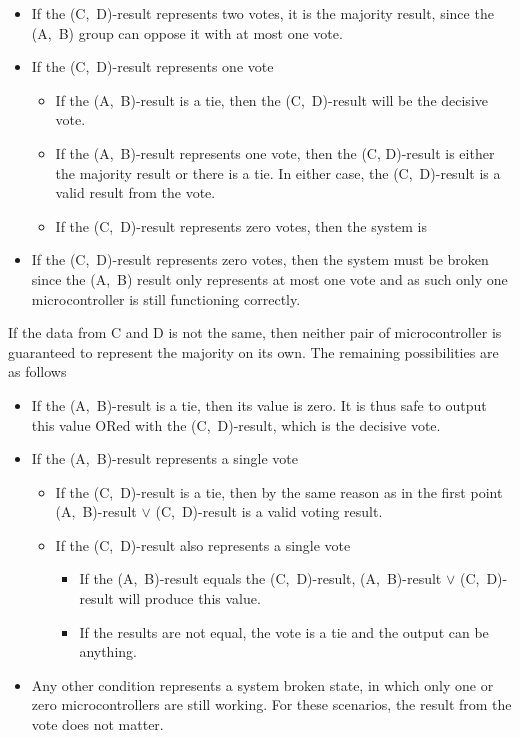 \begin{itemize}
\item If the (C,~D)-result represents two votes, it is the majority
  result, since the (A,~B) group can oppose it with at most one vote. 
  
\item If the (C,~D)-result represents one vote
  \begin{itemize}
  \item If the (A,~B)-result is a tie, then the (C,~D)-result will be
    the decisive vote. 
  \item If the (A,~B)-result represents one vote, then the (C,
    D)-result is either the majority result or there is a tie. In
    either case, the (C,~D)-result is a valid result from the vote.
  \item If the (C,~D)-result represents zero votes, then the system is
  \end{itemize}

\item If the (C,~D)-result represents zero votes, then the system must
  be broken since the (A,~B) result only represents at most one vote
  and as such only one microcontroller is still functioning correctly.
\end{itemize}

If the data from C and D is not the same, then neither pair of
microcontroller is guaranteed to represent the majority on its
own. The remaining possibilities are as follows

\begin{itemize}
\item If the (A,~B)-result is a tie, then its value is zero. It is
  thus safe to output this value ORed with the (C,~D)-result, which is
  the decisive vote.

\item If the (A,~B)-result represents a single vote
  \begin{itemize}
  \item If the (C,~D)-result is a tie, then by the same reason as in
    the first point (A,~B)-result $\vee$ (C,~D)-result is a valid
    voting result.

  \item If the (C,~D)-result also represents a single vote
    \begin{itemize}
    \item If the (A,~B)-result equals the (C,~D)-result, (A,~B)-result
      $\vee$ (C,~D)-result will produce this value.
    \item If the results are not equal, the vote is a tie and the
      output can be anything.
    \end{itemize}
  \end{itemize}

\item Any other condition represents a system broken state, in which
  only one or zero microcontrollers are still working. For these
  scenarios, the result from the vote does not matter.

\end{itemize}

